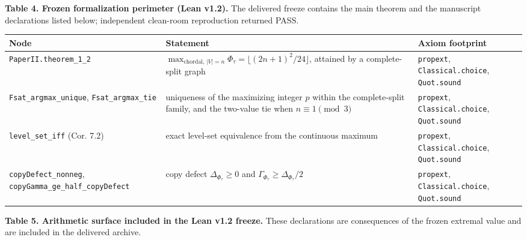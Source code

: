 \documentclass[english,11pt,a4paper]{article}
\newcounter{none}
\begin{document}
\textbf{Table 4. Frozen formalization perimeter (Lean v1.2).} The
delivered freeze contains the main theorem and the manuscript
declarations listed below; independent clean-room reproduction returned
PASS.

{\def\LTcaptype{none} %
\begin{longtable}[]{@{}
  >{\raggedright\arraybackslash}p{}
  >{\raggedright\arraybackslash}p{}
  >{\raggedright\arraybackslash}p{}@{}}
\toprule\noalign{}
\begin{minipage}[b]{\linewidth}\raggedright
Node
\end{minipage} & \begin{minipage}[b]{\linewidth}\raggedright
Statement
\end{minipage} & \begin{minipage}[b]{\linewidth}\raggedright
Axiom footprint
\end{minipage} \\
\midrule\noalign{}
\endhead
\bottomrule\noalign{}
\endlastfoot
\nolinkurl{PaperII.theorem_1_2} &
\(\max_{\text{chordal},\,|V|=n}\Phi_\tau=\lfloor(2n+1)^2/24\rfloor\),
attained by a complete-split graph & \nolinkurl{propext},
\nolinkurl{Classical.choice}, \nolinkurl{Quot.sound} \\
\nolinkurl{Fsat_argmax_unique}, \nolinkurl{Fsat_argmax_tie} & uniqueness
of the maximizing integer \(p\) within the complete-split family, and
the two-value tie when \(n\equiv1\pmod3\) & \nolinkurl{propext},
\nolinkurl{Classical.choice}, \nolinkurl{Quot.sound} \\
\nolinkurl{level_set_iff} (Cor. 7.2) & exact level-set equivalence from
the continuous maximum & \nolinkurl{propext}, \nolinkurl{Classical.choice},
\nolinkurl{Quot.sound} \\
\nolinkurl{copyDefect_nonneg}, \nolinkurl{copyGamma_ge_half_copyDefect} &
copy defect \(\Delta_{\Phi_\tau}\ge0\) and
\(\Gamma_{\Phi_\tau}\ge\Delta_{\Phi_\tau}/2\) & \nolinkurl{propext},
\nolinkurl{Classical.choice}, \nolinkurl{Quot.sound} \\
\end{longtable}
}

\textbf{Table 5. Arithmetic surface included in the Lean v1.2 freeze.}
These declarations are consequences of the frozen extremal value and are
included in the delivered archive.
\end{document}
